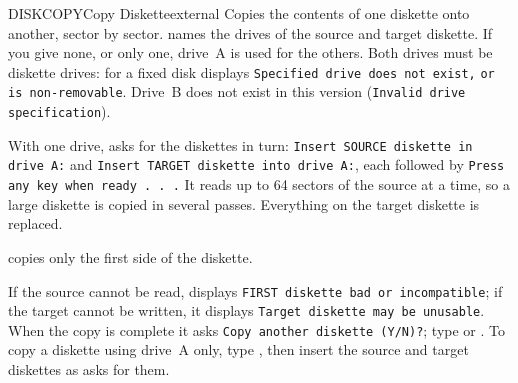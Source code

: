 \begin{DosEntry}{DISKCOPY}{Copy Diskette}{external}
\Purpose Copies the contents of one diskette onto another, sector by sector.
\Format {}
\Remarks
{} names the drives of the source and target diskette.  If you give
none, or only one, drive~A is used for the others.  Both drives must be
diskette drives: for a fixed disk  displays
\texttt{Specified drive does not exist,} \texttt{or is non-removable}.  Drive~B
does not exist in this version (\texttt{Invalid drive specification}).

With one drive,  asks for the diskettes in turn:
\texttt{Insert SOURCE diskette in drive A:} and \texttt{Insert TARGET
diskette into drive A:}, each followed by \texttt{Press any key when ready
. . .}  It reads up to 64 sectors of the source at a time, so a large
diskette is copied in several passes.  Everything on the target diskette is
replaced.

 copies only the first side of the diskette.

If the source cannot be read,  displays \texttt{FIRST
diskette bad or incompatible}; if the target cannot be written, it displays
\texttt{Target diskette may be unusable}.  When the copy is complete it asks
\texttt{Copy another diskette (Y/N)?}; type  or .
\Example
To copy a diskette using drive~A only, type , then
insert the source and target diskettes as  asks for them.
\end{DosEntry}

